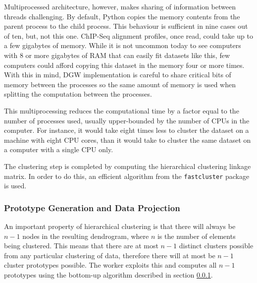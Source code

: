 \documentclass[parskip]{cs4rep}
\newcommand{\pythonpackage}[1]{{\tt #1}}
\begin{document}
Multiprocessed architecture, however, makes sharing of information between threads challenging.
By default, Python copies the memory contents from the parent process to the child process. This behaviour is sufficient in nine cases out of ten, but, not this one. ChIP-Seq alignment profiles, once read, could take up to a few gigabytes of memory. While it is not uncommon today to see computers with 8 or more gigabytes of RAM that can easily fit datasets like this, few computers could afford copying this dataset in the memory four or more times. With this in mind, DGW implementation is careful to share critical bits of memory between the processes so the same amount of memory is used when splitting the computation between the processes.

This multiprocessing reduces the computational time by a factor equal to the number of processes used, usually upper-bounded by the number of CPUs in the computer. For instance, it would take eight times less to cluster the dataset on a machine with eight CPU cores, than it would take to cluster the same 
dataset on a computer with a single CPU only. 

The clustering step is completed by computing the hierarchical clustering linkage matrix. In order to do this, an efficient 
algorithm from the \pythonpackage{fastcluster} package is used.

\subsubsection{Prototype Generation and Data Projection}
\label{sec:prototypes}

An important property of hierarchical clustering is that there will always be $n-1$ nodes in the resulting dendrogram, where $n$ is the number of elements being clustered. This means that there are at most $n-1$ distinct clusters possible from any particular clustering of data, therefore there will at most be $n-1$ cluster prototypes possible. The worker exploits this and computes all $n-1$ prototypes using the bottom-up algorithm described in section \ref{sec:prototypes}. 
\end{document}
